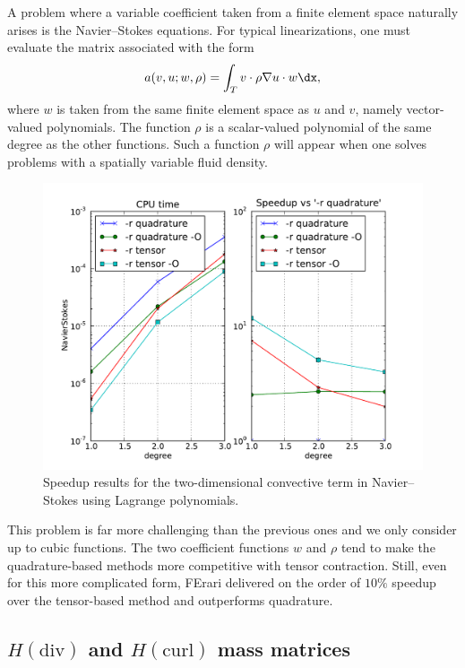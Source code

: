 A problem where a variable coefficient taken from a finite element
space naturally arises is the Navier--Stokes equations. For typical
linearizations, one must evaluate the matrix associated with the form
\begin{equation}
  a(v, u; w, \rho) = \int_T v \cdot \rho \nabla u \cdot w \dx,
\end{equation}
where \( w \) is taken from the same finite element space as \( u \)
and \( v \), namely vector-valued polynomials. The function \( \rho \)
is a scalar-valued polynomial of the same degree as the other
functions. Such a function \( \rho \) will appear when one solves
problems with a spatially variable fluid density.

\begin{figure}
  \begin{center}
    \includegraphics[width=12cm]{chapters/kirby-3/pdf/NavierStokes.pdf}
    \caption{Speedup results for the two-dimensional convective term
      in Navier--Stokes using Lagrange polynomials.}
    \label{fig:NavierStokes}
  \end{center}
\end{figure}

This problem is far more challenging than the previous ones and we
only consider up to cubic functions. The two coefficient functions \(
w \) and \( \rho \) tend to make the quadrature-based methods more
competitive with tensor contraction.  Still, even for this more
complicated form, FErari delivered on the order of \( 10\% \) speedup
over the tensor-based method and outperforms quadrature.

\subsection{$H(\mathrm{div})$ and $H(\mathrm{curl})$ mass matrices}


